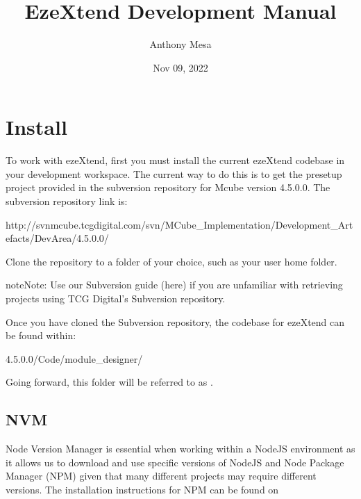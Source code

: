 \documentclass[letterpaper,10pt,english]{sphinxmanual}
\title{EzeXtend Development Manual}
\date{Nov 09, 2022}
\author{Anthony Mesa}
\begin{document}
\pagestyle{empty}
\sphinxmaketitle
\pagestyle{plain}
\sphinxtableofcontents
\pagestyle{normal}
\label{\detokenize{index::doc}}


\sphinxstepscope


\chapter{Install}
\label{\detokenize{install:install}}\label{\detokenize{install::doc}}
\sphinxAtStartPar
To work with ezeXtend, first you must install the current ezeXtend codebase in your development workspace. The current way to do this is to get the pre\sphinxhyphen{}setup project provided in the subversion repository for Mcube version 4.5.0.0. The subversion repository link is:
\begin{sphinxalltt}
http://svnmcube.tcgdigital.com/svn/MCube\_Implementation/Development\_Artefacts/Dev\sphinxhyphen{}Area/4.5.0.0/
\end{sphinxalltt}

\sphinxAtStartPar
Clone the repository to a folder of your choice, such as your user home folder.

\begin{sphinxadmonition}{note}{Note:}
\sphinxAtStartPar
Use our Subversion guide (here) if you are unfamiliar with retrieving projects using TCG Digital’s Subversion repository.
\end{sphinxadmonition}

\sphinxAtStartPar
Once you have cloned the Subversion repository, the codebase for ezeXtend can be found within:
\begin{sphinxalltt}
4.5.0.0/Code/module\_designer/
\end{sphinxalltt}

\sphinxAtStartPar
Going forward, this  folder will be referred to as .


\section{NVM}
\label{\detokenize{install:nvm}}
\sphinxAtStartPar
Node Version Manager is essential when working within a NodeJS environment as it allows us to download and use specific versions of NodeJS and Node Package Manager (NPM) given that many different projects may require different versions. The installation instructions for NPM can be found on 
\end{document}
